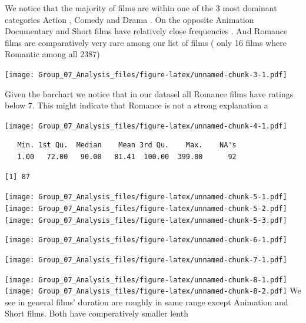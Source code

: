 \documentclass[
]{article}
\begin{document}
We notice that the majority of films are within one of the 3 most
dominant categories Action , Comedy and Drama . On the opposite
Animation Documentary and Short films have relatively close frequencies
. And Romance films are comparatively very rare among our list of films
( only 16 films where Romantic among all 2387)

\texttt{[image: Group\_07\_Analysis\_files/figure-latex/unnamed-chunk-3-1.pdf]}

Given the barchart we notice that in our datasel all Romance films have
ratings below 7. This might indicate that Romance is not a strong
explanation a

\texttt{[image: Group\_07\_Analysis\_files/figure-latex/unnamed-chunk-4-1.pdf]}

\begin{verbatim}
   Min. 1st Qu.  Median    Mean 3rd Qu.    Max.    NA's 
   1.00   72.00   90.00   81.41  100.00  399.00      92 
\end{verbatim}

\begin{verbatim}
[1] 87
\end{verbatim}

\texttt{[image: Group\_07\_Analysis\_files/figure-latex/unnamed-chunk-5-1.pdf]}
\texttt{[image: Group\_07\_Analysis\_files/figure-latex/unnamed-chunk-5-2.pdf]}
\texttt{[image: Group\_07\_Analysis\_files/figure-latex/unnamed-chunk-5-3.pdf]}

\texttt{[image: Group\_07\_Analysis\_files/figure-latex/unnamed-chunk-6-1.pdf]}

\texttt{[image: Group\_07\_Analysis\_files/figure-latex/unnamed-chunk-7-1.pdf]}

\texttt{[image: Group\_07\_Analysis\_files/figure-latex/unnamed-chunk-8-1.pdf]}
\texttt{[image: Group\_07\_Analysis\_files/figure-latex/unnamed-chunk-8-2.pdf]}
We see in general films' duration are roughly in same range except
Animation and Short films. Both have comperatively smaller lenth
\end{document}

